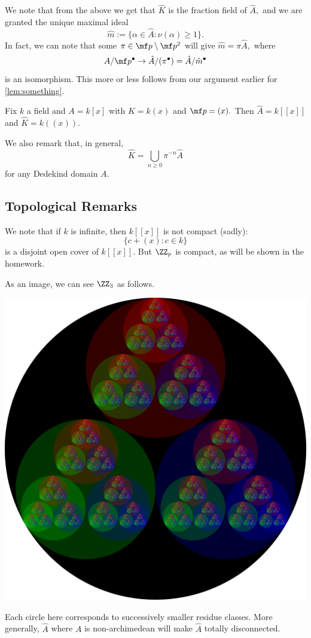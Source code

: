 \documentclass[../notes.tex]{subfiles}
\begin{document}
We note that from the above we get that $\hat K$ is the fraction field of $\hat A,$ and we are granted the unique maximal ideal
\[\hat m:=\{\alpha\in\hat A:\nu(\alpha)\ge1\}.\]
In fact, we can note that some $\pi\in\mf p\setminus\mf p^2$ will give $\hat m=\pi\hat A,$ where
\[A/\mf p^\bullet\to\hat A/(\pi^\bullet)=\hat A/\hat m^\bullet\]
is an isomorphism. This more or less follows from our argument earlier for \autoref{lem:something}. 
\begin{example}
	Fix $k$ a field and $A=k[x]$ with $K=k(x)$ and $\mf p=(x).$ Then $\hat A=k[[x]]$ and $\hat K=k((x)).$
\end{example}
We also remark that, in general,
\[\hat K=\bigcup_{n\ge 0}\pi^{-n}\hat A\]
for any Dedekind domain $A.$

\subsection{Topological Remarks}
We note that if $k$ is infinite, then $k[[x]]$ is not compact (sadly):
\[\{c+(x):c\in k\}\]
is a disjoint open cover of $k[[x]].$ But $\ZZ_p$ is compact, as will be shown in the homework.

As an image, we can see $\ZZ_3$ as follows.
\begin{center}
	\includegraphics[scale=0.1]{./3-adics-dark.png}
\end{center}
Each circle here corresponds to successively smaller residue classes. More generally, $\hat A$ where $A$ is non-archimedean will make $\hat A$ totally disconnected.
\end{document}
